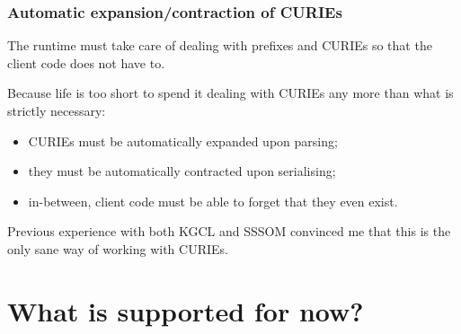 \begin{frame}
  \frametitle{Automatic expansion/contraction of CURIEs}

  \begin{block}{}
    The runtime must take care of dealing with prefixes and CURIEs so
    that the client code does not have to.
  \end{block}

  \bigskip
  Because life is too short to spend it dealing with CURIEs any more
  than what is strictly necessary:
  \begin{itemize}
    \item CURIEs must be automatically expanded upon parsing;
    \item they must be automatically contracted upon serialising;
    \item in-between, client code must be able to forget that they even
    exist.
  \end{itemize}

  \bigskip
  Previous experience with both KGCL and SSSOM convinced me that this is
  the only sane way of working with CURIEs.

\end{frame}

\section{What is supported for now?}

